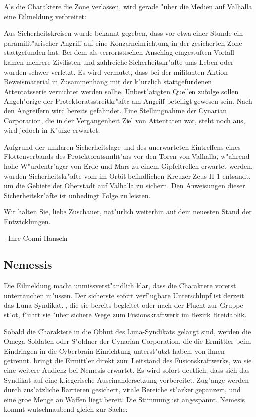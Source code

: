 
Als die Charaktere die Zone verlassen, wird gerade "uber die Medien auf Valhalla eine Eilmeldung verbreitet:

\begin{speech}
Aus Sicherheitskreisen wurde bekannt gegeben, dass vor etwa einer Stunde ein paramilit"arischer Angriff auf eine Konzerneinrichtung in der gesicherten Zone stattgefunden hat. Bei dem als terroristischen Anschlag eingestuften Vorfall kamen mehrere Zivilisten und zahlreiche Sicherheitskr"afte ums Leben oder wurden schwer verletzt. Es wird vermutet, dass bei der militanten Aktion Beweismaterial in Zusammenhang mit der k"urzlich stattgefundenen Attentatsserie vernichtet werden sollte. Unbest"atigten Quellen zufolge sollen Angeh"orige der Protektoratsstreitkr"afte am Angriff beteiligt gewesen sein. Nach den Angreifern wird bereits gefahndet. Eine Stellungnahme der Cynarian Corporation, die in der Vergangenheit Ziel von Attentaten war, steht noch aus, wird jedoch in K"urze erwartet.

\nopagebreak
Aufgrund der unklaren Sicherheitslage und des unerwarteten Eintreffens eines Flottenverbands des Protektoratsmilit"ars vor den Toren von Valhalla, w"ahrend hohe W"urdentr"ager von Erde und Mars zu einem Gipfeltreffen erwartet werden, wurden Sicherheitskr"afte vom im Orbit befindlichen Kreuzer Zeus II-1 entsandt, um die Gebiete der Oberstadt auf Valhalla zu sichern. Den Anweisungen dieser Sicherheitskr"afte ist unbedingt Folge zu leisten.

\nopagebreak
Wir halten Sie, liebe Zuschauer, nat"urlich weiterhin auf dem neuesten Stand der Entwicklungen.

\nopagebreak
- Ihre Conni Hanseln
\end{speech}

\subsection{Nemessis} 
Die Eilmeldung macht unmissverst"andlich klar, dass die Charaktere vorerst untertauchen m"ussen. Der sicherste sofort verf"ugbare Unterschlupf ist derzeit das Luna-Syndikat. \xl{}, die sie bereits begleitet oder nach der Flucht zur Gruppe st"o\3t, f"uhrt sie "uber sichere Wege zum Fusionskraftwerk im Bezirk Breidablik.

Sobald die Charaktere in die Obhut des Luna-Syndikats gelangt sind, werden die Omega-Soldaten oder S"oldner der Cynarian Corporation, die die Ermittler beim Eindringen in die Cyberbrain-Einrichtung unterst"utzt haben, von ihnen getrennt. \xl{} bringt die Ermittler direkt zum Leitstand des Fusionskraftwerks, wo sie eine weitere Audienz bei Nemesis erwartet. Es wird sofort deutlich, dass sich das Syndikat auf eine kriegerische Auseinandersetzung vorbereitet. Zug"ange werden durch zus"atzliche Barrieren gesichert, vitale Bereiche st"arker gepanzert, und eine gro\3e Menge an Waffen liegt bereit. Die Stimmung ist angespannt. Nemesis kommt wutschnaubend gleich zur Sache:

